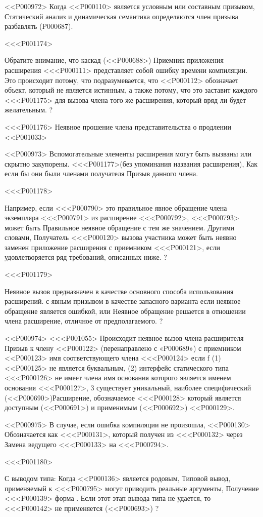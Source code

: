 {{{{{{{{{{{{{{{{{<<P000972>%
Когда <<P000110> является условным или составным призывом,
Статический анализ и динамическая семантика определяются
член призыва разбавлять
(P000687).

<<<P001174>{%
Обратите внимание, что каскад (<<P000688>)
Приемник приложения расширения <<<P000111> представляет собой ошибку времени компиляции.
Это происходит потому, что подразумевается, что <<P000112> обозначает объект, который не является истинным,
а также потому, что это заставит каждого <<<P001175>
для вызова члена того же расширения,
который вряд ли будет желательным.%
?


<<<P001176> Неявное прошение члена представительства о продлении
<<P001033>

<<P000973>%
Вспомогательные элементы расширения могут быть вызваны или скрытно закупорены.
<<<P001177>{(без упоминания названия расширения)},
Как если бы они были членами получателя
Призыв данного члена.

<<<P001178>{%
Например, если <<<P000790> это
правильное явное обращение члена экземпляра <<<P000791> из
расширение <<<P000792>,
<<<P000793> может быть
Правильное неявное обращение с тем же значением.
Другими словами,
Получатель <<<P000120> вызова участника может быть неявно заменен
приложение расширения с приемником <<<P000121>,
если удовлетворяется ряд требований, описанных ниже.%
?

<<<P001179>{%
Неявное вызов предназначен в качестве основного способа использования расширений.
с явным призывом в качестве запасного варианта
если неявное обращение является ошибкой, или
Неявное обращение решается в отношении члена
расширение, отличное от предполагаемого.%
?

<<P000974>%
<<<P001055>%
Происходит неявное вызов члена-расширителя
Призыв к члену <<P000122>
(перенаправлено с «P000689»)
с приемником <<P000123> имя соответствующего члена <<<P000124> если {f}
(1) <<P000125> не является буквальным,
(2) интерфейс статического типа <<<P000126> не имеет члена
имя основания которого является именем основания <<<P000127>,
3 существует уникальный, наиболее специфический
(<<P000690>)Расширение, обозначаемое <<<P000128> который является доступным
(<<P000691>)
и применимым
(<<P000692>)
<<P000129>.

<<P000975>%
В случае, если ошибка компиляции не произошла,
<<P000130> Обозначается как <<<P000131>, который получен из <<<P000132> через
Замена ведущего <<<P000133> на <<<P000794>.

<<<P001180>{%
С выводом типа:
Когда <<P000136> является родовым,
Типовой вывод, применяемый к <<<P000795> могут приводить реальные аргументы,
Получение <<<P000139> форма .
Если этот этап вывода типа не удается, то <<<P000142> не применяется
(<<P000693>) %
?

}}}}}}}}}}}}}}}}}}}}}
